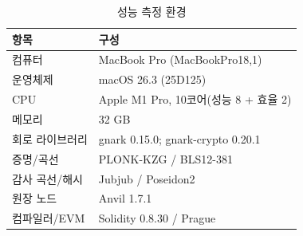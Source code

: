 \begin{table}[ht]
\centering\small
\caption{성능 측정 환경}
\label{tab:eval-env}
\begin{tabularx}{\columnwidth}{@{}lY@{}}
\toprule
항목 & 구성 \\ \midrule
컴퓨터 & MacBook Pro (MacBookPro18,1) \\
운영체제 & macOS 26.3 (25D125) \\
CPU & Apple M1 Pro, 10코어(성능 8 + 효율 2) \\
메모리 & 32 GB \\
회로 라이브러리 & gnark 0.15.0; gnark-crypto 0.20.1 \\
증명/곡선 & PLONK-KZG / BLS12-381 \\
감사 곡선/해시 & Jubjub / Poseidon2 \\
원장 노드 & Anvil 1.7.1 \\
컴파일러/EVM & Solidity 0.8.30 / Prague \\
\bottomrule
\end{tabularx}

\end{table}
